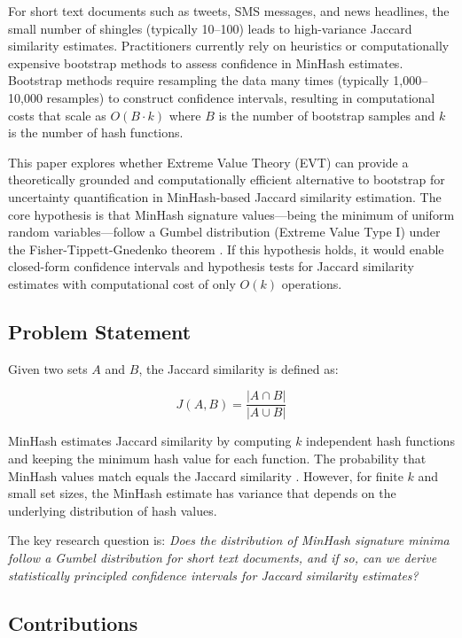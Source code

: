 \documentclass[11pt,letterpaper]{article}
\begin{document}
For short text documents such as tweets, SMS messages, and news headlines, the small number of shingles (typically 10--100) leads to high-variance Jaccard similarity estimates. Practitioners currently rely on heuristics or computationally expensive bootstrap methods to assess confidence in MinHash estimates. Bootstrap methods require resampling the data many times (typically 1,000--10,000 resamples) to construct confidence intervals, resulting in computational costs that scale as $O(B \cdot k)$ where $B$ is the number of bootstrap samples and $k$ is the number of hash functions.

This paper explores whether Extreme Value Theory (EVT) can provide a theoretically grounded and computationally efficient alternative to bootstrap for uncertainty quantification in MinHash-based Jaccard similarity estimation. The core hypothesis is that MinHash signature values---being the minimum of uniform random variables---follow a Gumbel distribution (Extreme Value Type I) under the Fisher-Tippett-Gnedenko theorem \cite{Fisher1928}. If this hypothesis holds, it would enable closed-form confidence intervals and hypothesis tests for Jaccard similarity estimates with computational cost of only $O(k)$ operations.

\subsection{Problem Statement}

Given two sets $A$ and $B$, the Jaccard similarity is defined as:

\begin{equation}
J(A, B) = \frac{|A \cap B|}{|A \cup B|}
\end{equation}

MinHash estimates Jaccard similarity by computing $k$ independent hash functions and keeping the minimum hash value for each function. The probability that MinHash values match equals the Jaccard similarity \cite{Broder1997}. However, for finite $k$ and small set sizes, the MinHash estimate has variance that depends on the underlying distribution of hash values.

The key research question is: \textit{Does the distribution of MinHash signature minima follow a Gumbel distribution for short text documents, and if so, can we derive statistically principled confidence intervals for Jaccard similarity estimates?}

\subsection{Contributions}
\end{document}

